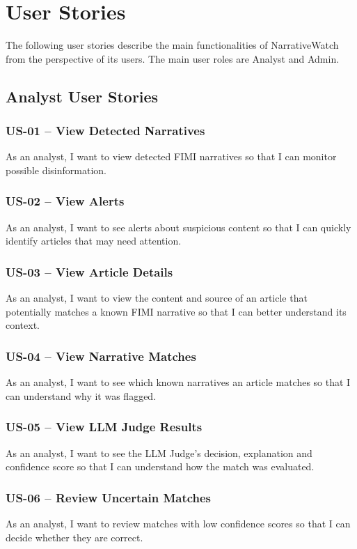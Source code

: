 \documentclass[12pt,a4paper]{article}
\begin{document}
\section{User Stories}

The following user stories describe the main functionalities of NarrativeWatch from the perspective of its users. The main user roles are Analyst and Admin.

\subsection{Analyst User Stories}
\subsubsection*{US-01 -- View Detected Narratives}
As an analyst, I want to view detected FIMI narratives so that I can monitor possible disinformation.

\subsubsection*{US-02 -- View Alerts}
As an analyst, I want to see alerts about suspicious content so that I can quickly identify articles that may need attention.

\subsubsection*{US-03 -- View Article Details}
As an analyst, I want to view the content and source of an article that potentially matches a known FIMI narrative so that I can better understand its context.

\subsubsection*{US-04 -- View Narrative Matches}
As an analyst, I want to see which known narratives an article matches so that I can understand why it was flagged.

\subsubsection*{US-05 -- View LLM Judge Results}
As an analyst, I want to see the LLM Judge's decision, explanation and confidence score so that I can understand how the match was evaluated.

\subsubsection*{US-06 -- Review Uncertain Matches}
As an analyst, I want to review matches with low confidence scores so that I can decide whether they are correct.
\end{document}
